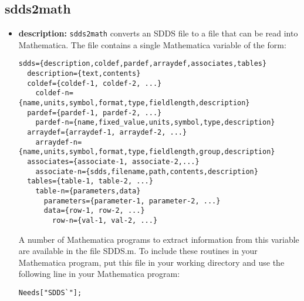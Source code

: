 \newpage 
\subsection{sdds2math} 
\label{sdds2math} 
 
\begin{itemize} 
\item {\bf description:} 
\verb|sdds2math| converts an SDDS file to a file that can be read into Mathematica. 
The file contains a single Mathematica variable of the form: 
 
\begin{verbatim} 
sdds={description,coldef,pardef,arraydef,associates,tables} 
  description={text,contents} 
  coldef={coldef-1, coldef-2, ...} 
    coldef-n={name,units,symbol,format,type,fieldlength,description} 
  pardef={pardef-1, pardef-2, ...} 
    pardef-n={name,fixed_value,units,symbol,type,description} 
  arraydef={arraydef-1, arraydef-2, ...} 
    arraydef-n={name,units,symbol,format,type,fieldlength,group,description} 
  associates={associate-1, associate-2,...} 
    associate-n={sdds,filename,path,contents,description} 
  tables={table-1, table-2, ...} 
    table-n={parameters,data} 
      parameters={parameter-1, parameter-2, ...} 
      data={row-1, row-2, ...} 
        row-n={val-1, val-2, ...} 
\end{verbatim} 
 
A number of Mathematica programs to extract information from this 
variable are available in the file SDDS.m.  To include these routines 
in your Mathematica program, put this file in your working directory 
and use the following line in your Mathematica program: 
\begin{verbatim} 
Needs["SDDS`"]; 
\end{verbatim} 
 

\end{itemize}
